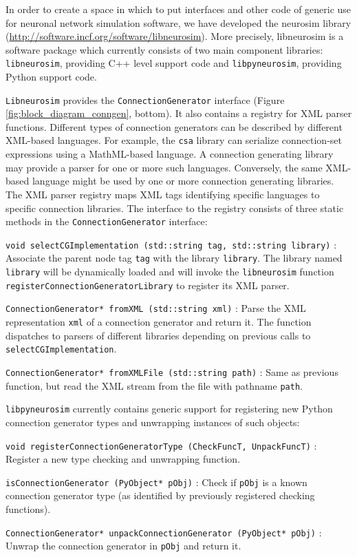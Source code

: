 \documentclass{frontiersSCNS} %
\begin{document}
In order to create a space in which to put interfaces and other code
of generic use for neuronal network simulation software, we have
developed the neurosim library
(\url{http://software.incf.org/software/libneurosim}).  More
precisely, libneurosim is a software package which currently consists
of two main component libraries: \verb|libneurosim|, providing C++
level support code and \verb|libpyneurosim|, providing Python support
code.

\verb|Libneurosim| provides the \verb|ConnectionGenerator| interface
(Figure \ref{fig:block_diagram_conngen}, bottom). It also contains a
registry for XML parser functions.  Different types of connection
generators can be described by different XML-based languages.  For
example, the \verb|csa| library can serialize connection-set
expressions using a MathML-based language.  A connection generating
library may provide a parser for one or more such languages.
Conversely, the same XML-based language might be used by one or more
connection generating libraries.  The XML parser registry maps XML
tags identifying specific languages to specific connection libraries.
The interface to the registry consists of three static methods in the
\verb|ConnectionGenerator| interface:

\begin{unlist}
\item[\tt void selectCGImplementation (std::string tag, std::string
  library)]:\\ Associate the parent node tag \verb|tag| with the library
  \verb|library|.  The library named \verb|library| will be
  dynamically loaded and will invoke the \verb|libneurosim| function
  \verb|registerConnectionGeneratorLibrary| to register its XML
  parser.
\item[\tt ConnectionGenerator* fromXML (std::string xml)]: Parse the
  XML representation \verb|xml| of a connection generator and return
  it. The function dispatches to parsers of different libraries
  depending on previous calls to \verb|selectCGImplementation|.
\item[\tt ConnectionGenerator* fromXMLFile (std::string path)]: Same as
  previous function, but read the XML stream from the file with
  pathname \verb|path|.
\end{unlist}

\verb|libpyneurosim| currently contains generic support for
registering new Python connection generator types and unwrapping
instances of such objects:

\begin{unlist}
\item[\tt void registerConnectionGeneratorType (CheckFuncT,
  UnpackFuncT)]: Register a new type checking and unwrapping
  function.
\item[\tt isConnectionGenerator (PyObject* pObj)]: Check if
  \verb|pObj| is a known connection generator type (as identified by
  previously registered checking functions).
\item[\tt ConnectionGenerator* unpackConnectionGenerator (PyObject*
  pObj)]: Unwrap the connection generator in \verb|pObj| and return
  it.
\end{unlist}
\end{document}
